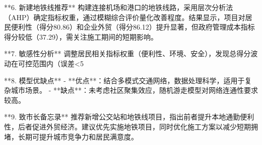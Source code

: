 \documentclass{ctexart}
\begin{document}
 **6. 新建地铁线推荐**
构建连接机场和港口的地铁线路，采用层次分析法（AHP）确定指标权重，通过模糊综合评价量化改善程度。结果显示，项目对居民便利性（得分80.86）和企业外贸（得分86.12）提升显著，但政府管理成本指标得分较低（37.29），需关注施工期间的短期影响。


 **7. 敏感性分析**
调整居民相关指标权重（便利性、环境、安全），发现总得分波动在可控范围内（误差<5%


 **8. 模型优缺点**
- **优点**：结合多模式交通网络，数据处理科学，适用于复杂城市场景。
- **缺点**：未考虑社区聚集效应，随机游走模型对网络连通性要求较高。


 **9. 致市长备忘录**
推荐新增公交站和地铁线项目，指出前者提升本地通勤便利性，后者促进外贸经济。建议优先实施地铁项目，同时优化施工方案以减少短期拥堵，长期可提升城市竞争力和居民满意度。
\end{document}
